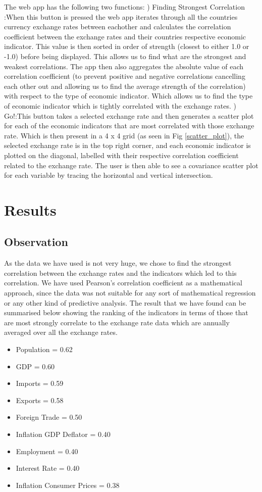 The web app has the following two functions:
)	Finding Strongest Correlation :When this button is pressed the web app iterates through all the countries currency exchange rates between eachother and calculates the correlation coefficient between the exchange rates and their countries respective economic indicator.  This value is then sorted in order of strength (closest to either 1.0 or -1.0) before being displayed.  This allows us to find what are the strongest and weakest correlations. The app then also aggregates the absolute value of each correlation coefficient (to prevent positive and negative correlations cancelling each other out and allowing us to find the average strength of the correlation) with respect to the type of economic indicator.  Which allows us to find the type of economic indicator which is tightly correlated with the exchange rates.
)	Go!:This button takes a selected exchange rate and then generates a scatter plot for each of the economic indicators that are most correlated with those exchange rate. Which is then present in a 4 x 4 grid (as seen in Fig \ref{scatter_plot}), the selected exchange rate is in the top right corner, and each economic indicator is plotted on the diagonal, labelled with their respective correlation coefficient related to the exchange rate.  The user is then able to see a covariance scatter plot for each variable by tracing the horizontal and vertical intersection.

\section{Results}
\subsection{Observation}
As the data we have used is not very huge, we chose to find the strongest correlation between the exchange rates and the indicators which led to this correlation. We have used Pearson's correlation coefficient as a mathematical approach, since the data was not suitable for any sort of mathematical regression or any other kind of predictive analysis. The result that we have found can be summarised below showing the ranking of the indicators in terms of those that are most strongly correlate to  the exchange rate data which are annually averaged over all the exchange rates.
\newline
\begin{itemize}
\item Population = 0.62
\item GDP = 0.60
\item Imports = 0.59
\item Exports = 0.58
\item Foreign Trade = 0.50
\item Inflation GDP Deflator = 0.40
\item Employment = 0.40
\item Interest Rate = 0.40
\item Inflation Consumer Prices = 0.38
\end{itemize}

